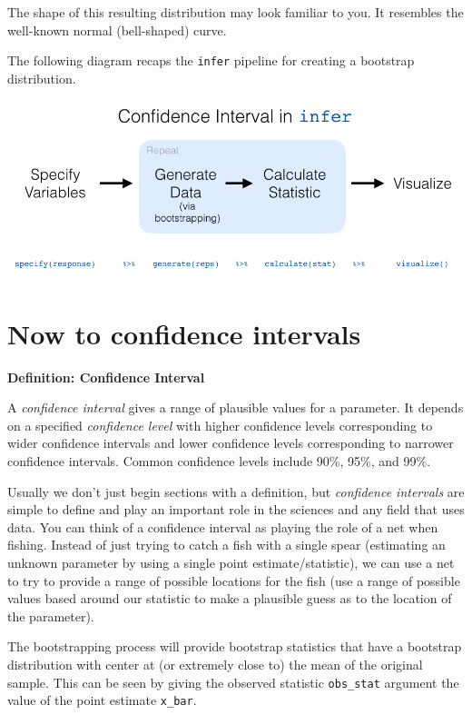 \documentclass[12pt,]{krantz}
\theoremstyle{definition}
\theoremstyle{definition}
\theoremstyle{definition}
\theoremstyle{remark}
\begin{document}
The shape of this resulting distribution may look familiar to you. It
resembles the well-known normal (bell-shaped) curve.

The following diagram recaps the \texttt{infer} pipeline for creating a
bootstrap distribution.

\begin{center}\includegraphics[width=\textwidth]{images/flowcharts/infer/ci_diagram} \end{center}

\section{Now to confidence intervals}\label{now-to-confidence-intervals}

\textbf{Definition: Confidence Interval}

A \emph{confidence interval} gives a range of plausible values for a
parameter. It depends on a specified \emph{confidence level} with higher
confidence levels corresponding to wider confidence intervals and lower
confidence levels corresponding to narrower confidence intervals. Common
confidence levels include 90\%, 95\%, and 99\%.

Usually we don't just begin sections with a definition, but
\emph{confidence intervals} are simple to define and play an important
role in the sciences and any field that uses data. You can think of a
confidence interval as playing the role of a net when fishing. Instead
of just trying to catch a fish with a single spear (estimating an
unknown parameter by using a single point estimate/statistic), we can
use a net to try to provide a range of possible locations for the fish
(use a range of possible values based around our statistic to make a
plausible guess as to the location of the parameter).

The bootstrapping process will provide bootstrap statistics that have a
bootstrap distribution with center at (or extremely close to) the mean
of the original sample. This can be seen by giving the observed
statistic \texttt{obs\_stat} argument the value of the point estimate
\texttt{x\_bar}.
\end{document}
